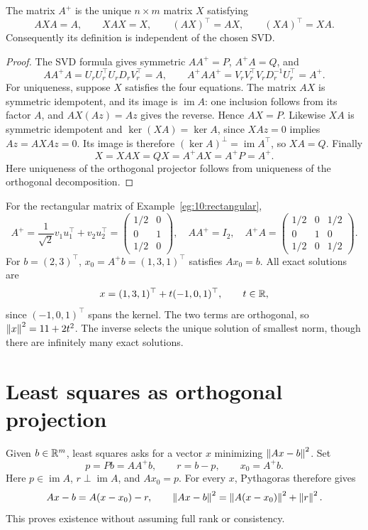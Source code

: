 \begin{theorem}
The matrix \(A^+\) is the unique \(n\times m\) matrix \(X\) satisfying
\[
AXA=A,\qquad XAX=X,\qquad (AX)^\top=AX,\qquad (XA)^\top=XA.
\]
Consequently its definition is independent of the chosen SVD.
\end{theorem}
\begin{proof}
The SVD formula gives symmetric \(AA^+=P\), \(A^+A=Q\), and
\[
AA^+A=U_rU_r^\top U_rD_rV_r^\top=A,\qquad
A^+AA^+=V_rV_r^\top V_rD_r^{-1}U_r^\top=A^+.
\]
For uniqueness, suppose \(X\) satisfies the four equations.
The matrix \(AX\) is symmetric idempotent, and its image is
\(\operatorname{im}A\): one inclusion follows from its factor \(A\),
and \(AX(Az)=Az\) gives the reverse. Hence \(AX=P\).
Likewise \(XA\) is symmetric idempotent and
\(\ker(XA)=\ker A\), since \(XAz=0\) implies \(Az=AXAz=0\).
Its image is therefore \((\ker A)^\perp=\operatorname{im}A^\top\), so
\(XA=Q\). Finally
\[
X=XAX=QX=A^+AX=A^+P=A^+.
\]
Here uniqueness of the orthogonal projector follows from uniqueness of
the orthogonal decomposition.
\end{proof}

\begin{example}
For the rectangular matrix of Example~\ref{eg:10:rectangular},
\[
A^+=\frac1{\sqrt2}v_1u_1^\top+v_2u_2^\top
=\begin{pmatrix}1/2&0\\0&1\\1/2&0\end{pmatrix},
\quad AA^+=I_2,\quad
A^+A=\begin{pmatrix}1/2&0&1/2\\0&1&0\\1/2&0&1/2\end{pmatrix}.
\]
For \(b=(2,3)^\top\), \(x_0=A^+b=(1,3,1)^\top\) satisfies \(Ax_0=b\).
All exact solutions are
\[
x=(1,3,1)^\top+t(-1,0,1)^\top,\qquad t\in\mathbb R,
\]
since \((-1,0,1)^\top\) spans the kernel. The two terms are orthogonal,
so \(\left\lVert x\right\rVert^2=11+2t^2\). The inverse selects the unique solution of
smallest norm, though there are infinitely many exact solutions.
\end{example}

\section*{Least squares as orthogonal projection}
Given \(b\in\mathbb R^m\), least squares asks for a vector \(x\) minimizing
\(\left\lVert Ax-b\right\rVert^2\). Set
\[
p=Pb=AA^+b,\qquad r=b-p,\qquad x_0=A^+b.
\]
Here \(p\in\operatorname{im}A\), \(r\perp\operatorname{im}A\), and
\(Ax_0=p\). For every \(x\), Pythagoras therefore gives
\[
Ax-b=A(x-x_0)-r,\qquad
\left\lVert Ax-b\right\rVert^2=\left\lVert A(x-x_0)\right\rVert^2+\left\lVert r\right\rVert^2.
\]
This proves existence without assuming full rank or consistency.

